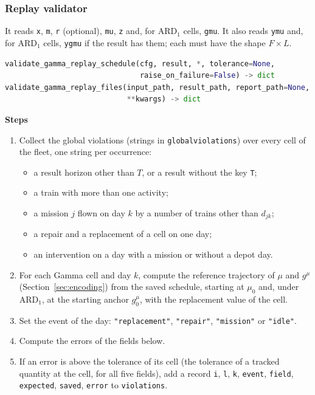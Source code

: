 \documentclass[11pt,a4paper]{article}
\theoremstyle{plain}
\theoremstyle{definition}
\newcommand{\ARDone}{\mathrm{ARD}_{1}}
\newcommand{\blockhead}[1]{\par\noindent\textbf{#1}\par\nobreak}
\renewcommand{\_}{\textunderscore\allowbreak{}}
\begin{document}
\subsubsection{Replay validator}

It reads \texttt{x}, \texttt{m}, \texttt{r} (optional), \texttt{mu}, \texttt{z} and, for $\ARDone$ cells, \texttt{g\_mu}. It also reads \texttt{y\_mu} and, for $\ARDone$ cells, \texttt{y\_g\_mu} if the result has them; each must have the shape $F \times L$.

\begin{lstlisting}[language=Python]
validate_gamma_replay_schedule(cfg, result, *, tolerance=None,
                               raise_on_failure=False) -> dict
validate_gamma_replay_files(input_path, result_path, report_path=None,
                            **kwargs) -> dict
\end{lstlisting}

\blockhead{Steps}
\begin{enumerate}[nosep,label=\arabic*.]
  \item Collect the global violations (strings in \texttt{global\_violations}) over every cell of the fleet, one string per occurrence:
  \begin{itemize}[nosep]
    \item a result horizon other than $T$, or a result without the key \texttt{T};
    \item a train with more than one activity;
    \item a mission $j$ flown on day $k$ by a number of trains other than $d_{jk}$;
    \item a repair and a replacement of a cell on one day;
    \item an intervention on a day with a mission or without a depot day.
  \end{itemize}
  \item For each Gamma cell and day $k$, compute the reference trajectory of $\mu$ and $g^{\mu}$ (Section~\ref{sec:encoding}) from the saved schedule, starting at $\mu_0$ and, under $\ARDone$, at the starting anchor $g^{\mu}_0$, with the replacement value of the cell.
  \item Set the event of the day: \texttt{"replacement"}, \texttt{"repair"}, \texttt{"mission"} or \texttt{"idle"}.
  \item Compute the errors of the fields below.
  \item If an error is above the tolerance of its cell (the tolerance of a tracked quantity at the cell, for all five fields), add a record \texttt{i}, \texttt{l}, \texttt{k}, \texttt{event}, \texttt{field}, \texttt{expected}, \texttt{saved}, \texttt{error} to \texttt{violations}.
\end{enumerate}
\end{document}
